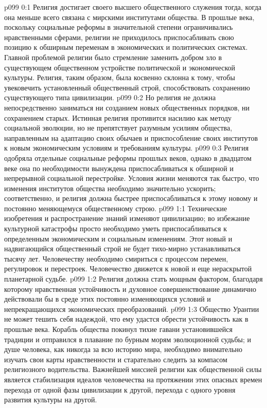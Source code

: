 \author{Мелхиседек}
\vs p099 0:1 Религия достигает своего высшего общественного служения тогда, когда она меньше всего связана с мирскими институтами общества. В прошлые века, поскольку социальные реформы в значительной степени ограничивались нравственными сферами, религии не приходилось приспосабливать свою позицию к обширным переменам в экономических и политических системах. Главной проблемой религии было стремление заменить добром зло в существующем общественном устройстве политической и экономической культуры. Религия, таким образом, была косвенно склонна к тому, чтобы увековечить установленный общественный строй, способствовать сохранению существующего типа цивилизации.
\vs p099 0:2 Но религия не должна непосредственно заниматься ни созданием новых общественных порядков, ни сохранением старых. Истинная религия противится насилию как методу социальной эволюции, но не препятствует разумным усилиям общества, направленным на адаптацию своих обычаев и приспособление своих институтов к новым экономическим условиям и требованиям культуры.
\vs p099 0:3 Религия одобряла отдельные социальные реформы прошлых веков, однако в двадцатом веке она по необходимости вынуждена приспосабливаться к обширной и непрерывной социальной перестройке. Условия жизни меняются так быстро, что изменения институтов общества необходимо значительно ускорить; соответственно, и религия должна быстрее приспосабливаться к этому новому и постоянно меняющемуся общественному строю.
\vs p099 1:1 Технические изобретения и распространение знаний изменяют цивилизацию; во избежание культурной катастрофы просто необходимо уметь приспосабливаться к определенным экономическим и социальным изменениям. Этот новый и надвигающийся общественный строй не будет тихо\hyp{}мирно устанавливаться тысячу лет. Человечеству необходимо смириться с процессом перемен, регулировок и перестроек. Человечество движется к новой и еще нераскрытой планетарной судьбе.
\vs p099 1:2 \pc Религия должна стать мощным фактором, благодаря которому нравственная устойчивость и духовное совершенствование динамично действовали бы в среде этих постоянно изменяющихся условий и непрекращающихся экономических преобразований.
\vs p099 1:3 \pc Общество Урантии не может тешить себя надеждой, что ему удастся обрести устойчивость как в прошлые века. Корабль общества покинул тихие гавани установившейся традиции и отправился в плавание по бурным морям эволюционной судьбы; и душе человека, как никогда за всю историю мира, необходимо внимательно изучать свои карты нравственности и старательно следить за компасом религиозного водительства. Важнейшей миссией религии как общественной силы является стабилизация идеалов человечества на протяжении этих опасных времен перехода от одной фазы цивилизации к другой, перехода с одного уровня развития культуры на другой.
